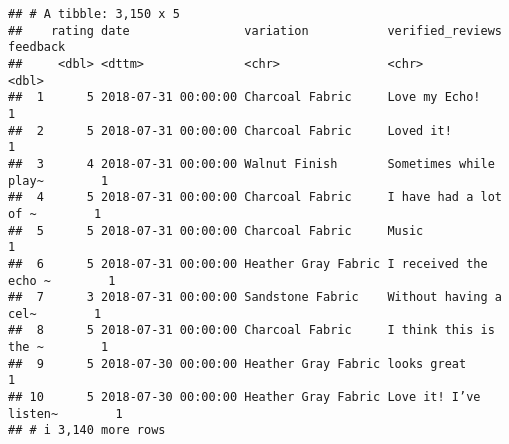 \documentclass[
]{article}
\begin{document}
\begin{verbatim}
## # A tibble: 3,150 x 5
##    rating date                variation           verified_reviews      feedback
##     <dbl> <dttm>              <chr>               <chr>                    <dbl>
##  1      5 2018-07-31 00:00:00 Charcoal Fabric     Love my Echo!                1
##  2      5 2018-07-31 00:00:00 Charcoal Fabric     Loved it!                    1
##  3      4 2018-07-31 00:00:00 Walnut Finish       Sometimes while play~        1
##  4      5 2018-07-31 00:00:00 Charcoal Fabric     I have had a lot of ~        1
##  5      5 2018-07-31 00:00:00 Charcoal Fabric     Music                        1
##  6      5 2018-07-31 00:00:00 Heather Gray Fabric I received the echo ~        1
##  7      3 2018-07-31 00:00:00 Sandstone Fabric    Without having a cel~        1
##  8      5 2018-07-31 00:00:00 Charcoal Fabric     I think this is the ~        1
##  9      5 2018-07-30 00:00:00 Heather Gray Fabric looks great                  1
## 10      5 2018-07-30 00:00:00 Heather Gray Fabric Love it! I’ve listen~        1
## # i 3,140 more rows
\end{verbatim}
\end{document}
